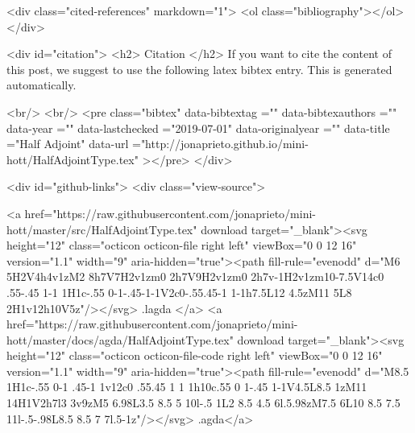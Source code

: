   <div class="cited-references" markdown="1">
  <ol class="bibliography"></ol>
  </div>


  
  <div id="citation">
  <h2> Citation </h2>
  If you want to cite the content of this post,
  we suggest to use the following latex bibtex entry.
  This is generated automatically.

  <br/>
  <br/>
  <pre class="bibtex"
       data-bibtextag =""
       data-bibtexauthors =""
       data-year =""
       data-lastchecked ="2019-07-01"
       data-originalyear =""
       data-title ="Half Adjoint"
       data-url ="http://jonaprieto.github.io/mini-hott/HalfAdjointType.tex"
  ></pre>
  </div>
  

  <div id="github-links">
    <div class="view-source">
      
        <a href="https://raw.githubusercontent.com/jonaprieto/mini-hott/master/src/HalfAdjointType.tex" download target="_blank"><svg height="12" class="octicon octicon-file right left" viewBox="0 0 12 16" version="1.1" width="9" aria-hidden="true"><path fill-rule="evenodd" d="M6 5H2V4h4v1zM2 8h7V7H2v1zm0 2h7V9H2v1zm0 2h7v-1H2v1zm10-7.5V14c0 .55-.45 1-1 1H1c-.55 0-1-.45-1-1V2c0-.55.45-1 1-1h7.5L12 4.5zM11 5L8 2H1v12h10V5z"/></svg> .lagda </a>
        <a href="https://raw.githubusercontent.com/jonaprieto/mini-hott/master/docs/agda/HalfAdjointType.tex" download target="_blank"><svg height="12" class="octicon octicon-file-code right left" viewBox="0 0 12 16" version="1.1" width="9" aria-hidden="true"><path fill-rule="evenodd" d="M8.5 1H1c-.55 0-1 .45-1 1v12c0 .55.45 1 1 1h10c.55 0 1-.45 1-1V4.5L8.5 1zM11 14H1V2h7l3 3v9zM5 6.98L3.5 8.5 5 10l-.5 1L2 8.5 4.5 6l.5.98zM7.5 6L10 8.5 7.5 11l-.5-.98L8.5 8.5 7 7l.5-1z"/></svg> .agda</a>
      
